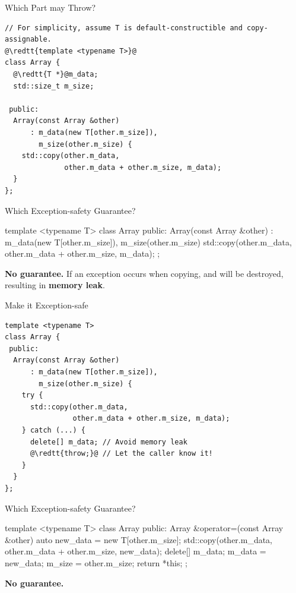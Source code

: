 \documentclass{beamer}
\begin{document}
\begin{frame}[fragile]{Which Part may Throw?}
    \begin{lstlisting}[language = {[11]C++}, escapechar = \@]
// For simplicity, assume T is default-constructible and copy-assignable.
@\redtt{template <typename T>}@
class Array {
  @\redtt{T *}@m_data;
  std::size_t m_size;

 public:
  Array(const Array &other)
      : m_data(new T[other.m_size]),
        m_size(other.m_size) {
    std::copy(other.m_data,
              other.m_data + other.m_size, m_data);
  }
};
    \end{lstlisting}
\end{frame}

\begin{frame}[fragile]{Which Exception-safety Guarantee?}
    \begin{cpp}
template <typename T>
class Array {
 public:
  Array(const Array &other)
      : m_data(new T[other.m_size]),
        m_size(other.m_size) {
    std::copy(other.m_data,
              other.m_data + other.m_size, m_data);
  }
};
    \end{cpp}
    \pause
    \textbf{No guarantee.} If an exception occurs when copying,  and  will be destroyed, resulting in \textbf{memory leak}.
\end{frame}

\begin{frame}[fragile]{Make it Exception-safe}
    \begin{lstlisting}[language = {[11]C++}, escapechar = \@]
template <typename T>
class Array {
 public:
  Array(const Array &other)
      : m_data(new T[other.m_size]),
        m_size(other.m_size) {
    try {
      std::copy(other.m_data,
                other.m_data + other.m_size, m_data);
    } catch (...) {
      delete[] m_data; // Avoid memory leak
      @\redtt{throw;}@ // Let the caller know it!
    }
  }
};
    \end{lstlisting}
\end{frame}

\begin{frame}[fragile]{Which Exception-safety Guarantee?}
    \begin{cpp}
template <typename T>
class Array {
 public:
  Array &operator=(const Array &other) {
    auto new_data = new T[other.m_size];
    std::copy(other.m_data,
              other.m_data + other.m_size, new_data);
    delete[] m_data;
    m_data = new_data;
    m_size = other.m_size;
    return *this;
  }
};
    \end{cpp}
    \pause
    \textbf{No guarantee.}
\end{frame}
\end{document}
